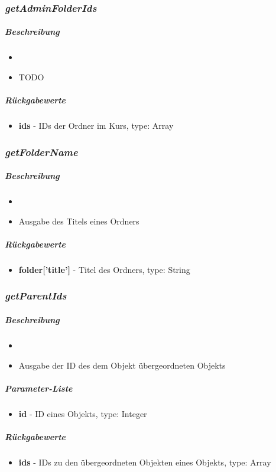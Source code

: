 \subsubsection*{\textit{getAdminFolderIds}}\label{getAdminFolderIdsLGUI}
\subparagraph{Beschreibung}
\begin{itemize}
	\item[] \noindent{} 
	\item[] TODO
\end{itemize}
\subparagraph{Rückgabewerte}
\begin{itemize}
	\item[] \textbf{ids} - IDs der Ordner im Kurs, type: Array
\end{itemize}

\subsubsection*{\textit{getFolderName}}\label{getFolderNameLGUI}
\subparagraph{Beschreibung}
\begin{itemize}
	\item[] \noindent{} 
	\item[] Ausgabe des Titels eines Ordners
\end{itemize}
\subparagraph{Rückgabewerte}
\begin{itemize}
	\item[] \textbf{folder['title']} - Titel des Ordners, type: String 
\end{itemize}

\subsubsection*{\textit{getParentIds}}\label{getParentIdsLGUI}
\subparagraph{Beschreibung}
\begin{itemize}
	\item[] \noindent{} 
	\item[] Ausgabe der ID des dem Objekt übergeordneten Objekts
\end{itemize}
\subparagraph{Parameter-Liste}
\begin{itemize}
	\item[] \textbf{id} - ID eines Objekts, type: Integer 
\end{itemize}
\subparagraph{Rückgabewerte}
\begin{itemize}
	\item[] \textbf{ids} - IDs zu den übergeordneten Objekten eines Objekts, type: Array
\end{itemize}

